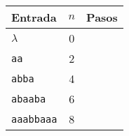 \begin{table}[h]
    \centering
    \begin{tabular}{lcc}
        Entrada & $n$ & Pasos \\
        \hline
        $\lambda$               & 0  &   \\
        \texttt{aa}             & 2  &  \\
        \texttt{abba}           & 4  &  \\
        \texttt{abaaba}         & 6  &  \\
        \texttt{aaabbaaa}       & 8  &  \\
    \end{tabular}
\end{table}